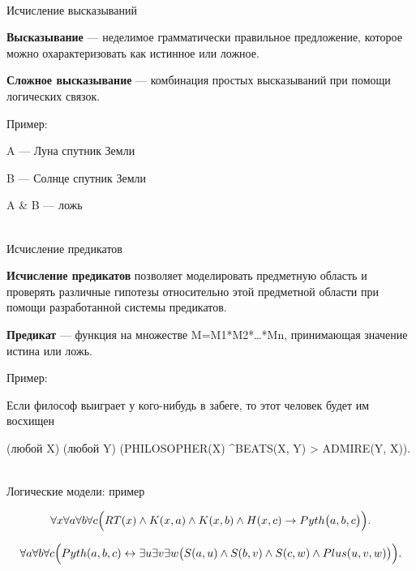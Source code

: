 \begin{frame}{\\Исчисление высказываний}
	\topline
	\justifying
	
	\textbf{Высказывание} --- неделимое грамматически правильное предложение, которое можно охарактеризовать как истинное или ложное.
	
	\vspace{1em}
	
	\textbf{Сложное высказывание} --- комбинация простых высказываний при помощи логических связок.
	
	\vspace{1em}
	
	Пример:
	\begin{textitemize}
		\item A --- Луна спутник Земли
		\item B --- Солнце спутник Земли
		\item A \& B --- ложь
	\end{textitemize}
	
\end{frame}

\begin{frame}{\\Исчисление предикатов}
	\topline
	\justifying
	
	\textbf{Исчисление предикатов} позволяет моделировать предметную область и проверять различные гипотезы относительно этой предметной области при помощи разработанной системы предикатов.
	
	\vspace{1em}
	
	\textbf{Предикат} --- функция на множестве M=M1*M2*…*Mn, принимающая значение истина или ложь.
	
	\vspace{1em}
	
	Пример:
	\begin{textitemize}
		\item Если философ выиграет у кого-нибудь в забеге, то этот человек будет им восхищен
		\item (любой X) (любой Y) (PHILOSOPHER(X) \textasciicircum BEATS(X, Y) > ADMIRE(Y, X)).
	\end{textitemize}
	
\end{frame}

\begin{frame}{\\Логические модели: пример}
	\topline
	\justifying
	
	\[
	\forall x \forall a \forall b \forall c \Bigl(
	RT(x) \land K(x,a) \land K(x,b) \land H(x,c)
	\rightarrow
	Pyth\bigl(a,b,c\bigr)
	\Bigr).
	\]
	
	\[
	\forall a \forall b \forall c \Bigl(
	Pyth(a,b,c) \leftrightarrow
	\exists u \exists v \exists w \bigl(
	S(a,u) \land S(b,v) \land S(c,w) \land Plus(u,v,w)
	\bigr)
	\Bigr).
	\]
	
\end{frame}

